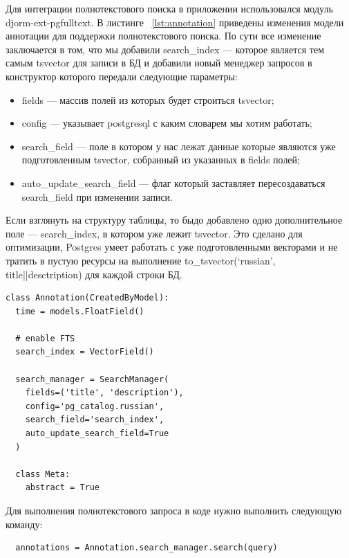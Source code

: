 Для интеграции полнотекстового поиска в приложении использовался модуль djorm-ext-pgfulltext. В листинге ~\ref{lst:annotation}
приведены изменения модели аннотации для поддержки полнотекстового поиска. По сути все изменение заключается в том,
что мы добавили search\_index — которое является тем самым tsvector для записи в БД и добавили
новый менеджер запросов в конструктор которого передали следующие параметры:

\begin{itemize}[wide,topsep=0pt]
  \itemsep0em
  \item fields — массив полей из которых будет строиться tsvector;
  \item config — указывает postgresql с каким словарем мы хотим работать;
  \item search\_field — поле в котором у нас лежат данные которые являются уже подготовленным tsveсtor, собранный из указанных в fields полей;
  \item auto\_update\_search\_field — флаг который заставляет пересоздаваться\\ search\_field при изменении записи.
\end{itemize}

Если взглянуть на структуру таблицы, то быдо добавлено одно дополнительное поле — search\_index,
в котором уже лежит tsvector. Это сделано для оптимизации, Postgres умеет работать с уже подготовленными векторами
и не тратить в пустую ресурсы на выполнение to\_tsvector(‘russian’, title||desctription) для каждой строки БД.

\FloatBarrier

\begin{lstlisting}[caption={Изменения в модели аннотации для возможности поиска}, label=lst:annotation]
class Annotation(CreatedByModel):
  time = models.FloatField()

  # enable FTS
  search_index = VectorField()

  search_manager = SearchManager(
    fields=('title', 'description'),
    config='pg_catalog.russian',
    search_field='search_index',
    auto_update_search_field=True
  )

  class Meta:
    abstract = True
\end{lstlisting}

\FloatBarrier

Для выполнения полнотекстового запроса в коде нужно выполнить следующую команду:
\begin{verbatim}
  annotations = Annotation.search_manager.search(query)
\end{verbatim}


